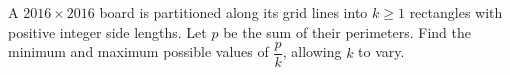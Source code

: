 A $2016\times2016$ board is partitioned along its grid lines into $k\ge1$ rectangles with positive integer side lengths. Let $p$ be the sum of their perimeters. Find the minimum and maximum possible values of $\dfrac{p}{k}$, allowing $k$ to vary.

